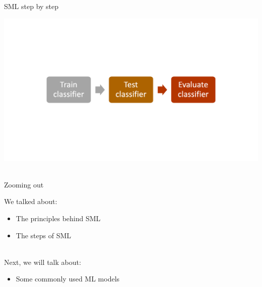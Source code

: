 \documentclass[handout]{beamer}
\begin{document}
\begin{frame}{SML step by step}
	
	\begin{center}
		\includegraphics[width=\linewidth,height=\textheight,keepaspectratio]{../pictures/MLprocess.png} \\\
	\end{center}

	\begin{tiny}
	\end{tiny}

	
	
\end{frame}


\begin{frame}{Zooming out} 
	
	We talked about:
	\begin{itemize}
		\item The principles behind SML
		\item The steps of SML \\\
	\end{itemize}
	
	Next, we will talk about:
	\begin{itemize}
		\item Some commonly used ML models
	\end{itemize}
	
\end{frame}
\end{document}
